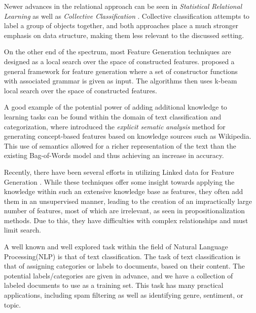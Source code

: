 \documentclass[12pt, a4paper]{article}
\theoremstyle{definition}
\begin{document}
Newer advances in the relational approach can be seen in \emph{Statistical Relational Learning} \citep{blockeel2013statistical, nath2014learning} as well as \emph{Collective Classification} \citep{kajdanowicz2013collective, laorden2012collective}. Collective classification attempts to label a group of objects together, and both approaches place a much stronger emphasis on data structure, making them less relevant to the discussed setting.


On the other end of the spectrum, most Feature Generation techniques are designed as a local search over the space of constructed features.
\citet{markovitch2002feature} proposed a general framework for feature generation where a set of constructor functions  with associated grammar is given as input.  The algorithms then uses k-beam local search over the space of constructed features.

A good example of the potential power of adding additional knowledge to learning tasks can be found within the domain of text classification and categorization, where \citet{gabrilovich2007computing}
introduced the \emph{explicit sematic analysis} method for generating concept-based features based on knowledge sources such as Wikipedia.
This use of semantics allowed for a richer representation of the text than the existing Bag-of-Words model and thus achieving an increase in accuracy.

Recently, there have been several efforts in utilizing Linked data for Feature Generation \citep{cheng2011automated, paulheim2012unsupervised}. While these techniques offer some insight towards applying the knowledge within such an extensive knowledge base as features, they often add them in an unsupervised manner, leading to the creation of an impractically large number of features, most of which are irrelevant, as seen in propositionalization methods. Due to this, they have difficulties with complex relationships and must limit search.

A well known and well explored task within the field of Natural Language Processing(NLP) is that of text classification.
The task of text classification is that of assigning categories or labels to documents, based on their content. The potential labels/categories are given in advance, and we have a collection of labeled documents to use as a training set. This task has many practical applications, including spam filtering as well as identifying genre, sentiment, or topic.
\end{document}
